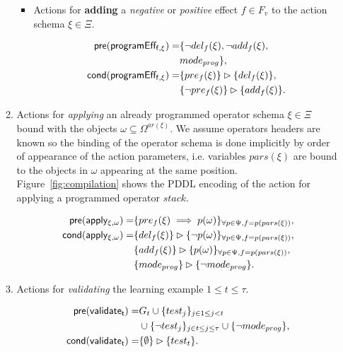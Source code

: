 \documentclass[letterpaper]{article} %
\newcommand{\pre}{\mathsf{pre}}     %
\newcommand{\cond}{\mathsf{cond}}   %
\begin{document}
\begin{itemize}
\begin{enumerate}
\begin{itemize}
\item Actions for {\bf adding} a {\em negative} or {\em positive} effect $f\in F_v$ to the action schema $\xi\in\Xi$.

\begin{small}
\begin{align*}
\hspace*{7pt}\pre(\mathsf{programEff_{f,\xi}})=&\{\neg del_{f}(\xi),\neg add_{f}(\xi),\\
& mode_{prog}\},\\
\cond(\mathsf{programEff_{f,\xi}})=&\{pre_{f}(\xi)\}\rhd\{del_{f}(\xi)\},\\
&\{\neg pre_{f}(\xi)\}\rhd\{add_{f}(\xi)\}.
\end{align*}
\end{small}
\end{itemize}

\item Actions for {\em applying} an already programmed operator schema $\xi\in\Xi$ bound with the objects $\omega\subseteq\Omega^{ar(\xi)}$. We assume operators headers are known so the binding of the operator schema is done implicitly by order of appearance of the action parameters, i.e. variables $pars(\xi)$ are bound to the objects in $\omega$ appearing at the same position. Figure~\ref{fig:compilation} shows the PDDL encoding of the action for applying a programmed operator $stack$.
\begin{small}
\begin{align*}
\hspace*{7pt}\pre(\mathsf{apply_{\xi,\omega}})=&\{pre_{f}(\xi)\implies p(\omega)\}_{\forall p\in\Psi,f=p(pars(\xi))},\\
\cond(\mathsf{apply_{\xi,\omega}})=&\{del_{f}(\xi)\}\rhd\{\neg p(\omega)\}_{\forall p\in\Psi,f=p(pars(\xi))},\\
&\{add_{f}(\xi)\}\rhd\{p(\omega)\}_{\forall p\in\Psi,f=p(pars(\xi))},\\
&\{mode_{prog}\}\rhd\{\neg mode_{prog}\}.
\end{align*}
\end{small}

\item Actions for {\em validating} the learning example {\tt\small $1\leq t\leq \tau$}.
\begin{small}
\begin{align*}
\hspace*{7pt}\pre(\mathsf{validate_{t}})=&G_t\cup\{test_j\}_{j\in 1\leq j<t}\\
&\cup\{\neg test_j\}_{j\in t\leq j\leq \tau}\cup \{\neg mode_{prog}\},\\
\cond(\mathsf{validate_{t}})=&\{\emptyset\}\rhd\{test_t\}.
\end{align*}
\end{small}
\end{enumerate}
\end{itemize}
\end{document}
